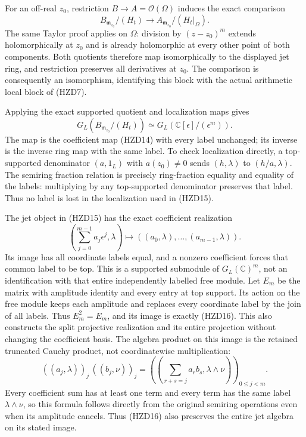 For an off-real $z_0$, restriction $B\to A=\mathcal O(\Omega)$
induces the exact comparison
\[
 B_{\mathfrak m_{z_0}}/(H_t)
   \longrightarrow A_{\mathfrak m_{z_0}}/(H_t|_\Omega).
\]
The same Taylor proof applies on $\Omega$: division by
$(z-z_0)^m$ extends holomorphically at $z_0$ and is already
holomorphic at every other point of both components. Both
quotients therefore map isomorphically to the displayed jet
ring, and restriction preserves all derivatives at $z_0$.
The comparison is consequently an isomorphism, identifying
this block with the actual arithmetic local block of (HZD7).

Applying the exact supported quotient and localization maps gives
\begin{equation}\tag{HZD15}
 G_L(B_{\mathfrak m_{z_0}}/(H_t))
   \simeq G_L(\mathbb C[\epsilon]/(\epsilon^m)).
\end{equation}
The map is the coefficient map (HZD14) with every label unchanged;
its inverse is the inverse ring map with the same label. To check
localization directly, a top-supported denominator $(a,1_L)$
with $a(z_0)\ne0$ sends $(h,\lambda)$ to $(h/a,\lambda)$.
The semiring fraction relation is precisely ring-fraction equality
and equality of the labels: multiplying by any top-supported
denominator preserves that label. Thus no label is lost in the
localization used in (HZD15).

The jet object in (HZD15) has the exact coefficient realization
\begin{equation}\tag{HZD16}
 \left(\sum_{j=0}^{m-1}a_j\epsilon^j,\lambda\right)
       \longmapsto((a_0,\lambda),\ldots,(a_{m-1},\lambda)).
\end{equation}
Its image has all coordinate labels equal, and a nonzero
coefficient forces that common label to be top. This is a
supported submodule of $G_L(\mathbb C)^m$, not an identification
with that entire independently labelled free module. Let $E_m$
be the matrix with amplitude identity and every entry at top
support. Its action on the free module keeps each amplitude
and replaces every coordinate label by the join of all labels.
Thus $E_m^2=E_m$, and its image is exactly (HZD16). This also
constructs the split projective realization and its entire
projection without changing the coefficient basis.
The algebra product on this image is the retained truncated
Cauchy product, not coordinatewise multiplication:
\[
 ((a_j,\lambda))_j\,((b_j,\nu))_j
   =\left(\left(\sum_{r+s=j}a_rb_s,\lambda\wedge\nu\right)\right)_{0\le j<m}.
\]
Every coefficient sum has at least one term and every term has
the same label $\lambda\wedge\nu$, so this formula follows
directly from the original semiring operations even when its
amplitude cancels. Thus (HZD16) also preserves the entire jet
algebra on its stated image.

